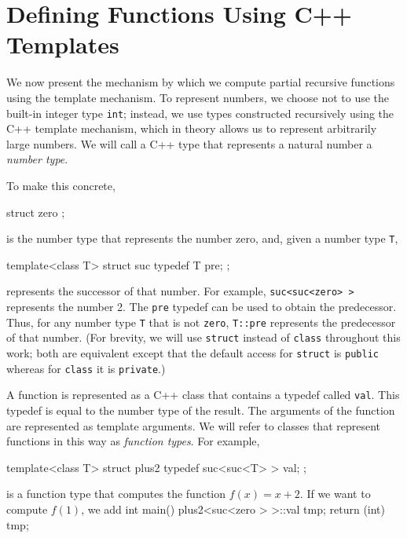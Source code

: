 \documentclass[final]{beatcs}
\newcommand{\cppid}[1]{\texttt{#1}}
\newenvironment{cppsrc}{\begingroup \small \selectfont \verbatim}
{\endverbatim \endgroup}
\begin{document}
\section{Defining Functions Using C++ Templates}

We now present the mechanism by which we compute partial recursive functions
using the template mechanism.
To represent numbers, we choose not to use the built-in integer type
\cppid{int}; instead, we use types constructed recursively using the C++
template mechanism, which in theory allows us to represent arbitrarily large
numbers. 
We will call a C++ type that represents a natural number a
\emph{number type}.

To make this concrete,

\begin{cppsrc}
struct zero { };
\end{cppsrc}

\noindent is the number type that represents the number zero, and, given a
number type \cppid{T},

\begin{cppsrc}
template<class T> struct suc
{
	typedef T pre;
};
\end{cppsrc}

\noindent represents the successor of that number. For example,
\cppid{suc<suc<zero>~>} represents the number 2. The \cppid{pre} typedef
can be used to obtain the predecessor. Thus, for any number type
\cppid{T} that is not \cppid{zero}, \cppid{T::pre} represents the predecessor
of that number.
(For brevity, we will use \cppid{struct} instead 
of \cppid{class} throughout this
work; both are equivalent except that the default access for 
\cppid{struct} is \cppid{public} whereas for \cppid{class} it is 
\cppid{private}.)

A function is represented as a C++ class that contains a typedef
called \cppid{val}. This typedef is equal to the number type of the
result. The arguments of the function are represented as template arguments.
We will refer to classes that represent functions in this way as
\emph{function types}. For example,

\begin{cppsrc}
template<class T> struct plus2
{
	typedef suc<suc<T> > val;
};
\end{cppsrc}

\noindent is a function type that computes the function $f(x)=x+2$. 
If we want to compute $f(1)$, we add 
\begin{cppsrc}
int main()
{
	plus2<suc<zero > >::val tmp;
	return (int) tmp;
}
\end{cppsrc}
\end{document}
